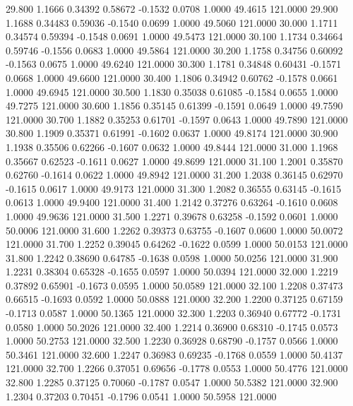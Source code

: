  29.800   1.1666   0.34392   0.58672  -0.1532   0.0708   1.0000  49.4615 121.0000
  29.900   1.1688   0.34483   0.59036  -0.1540   0.0699   1.0000  49.5060 121.0000
  30.000   1.1711   0.34574   0.59394  -0.1548   0.0691   1.0000  49.5473 121.0000
  30.100   1.1734   0.34664   0.59746  -0.1556   0.0683   1.0000  49.5864 121.0000
  30.200   1.1758   0.34756   0.60092  -0.1563   0.0675   1.0000  49.6240 121.0000
  30.300   1.1781   0.34848   0.60431  -0.1571   0.0668   1.0000  49.6600 121.0000
  30.400   1.1806   0.34942   0.60762  -0.1578   0.0661   1.0000  49.6945 121.0000
  30.500   1.1830   0.35038   0.61085  -0.1584   0.0655   1.0000  49.7275 121.0000
  30.600   1.1856   0.35145   0.61399  -0.1591   0.0649   1.0000  49.7590 121.0000
  30.700   1.1882   0.35253   0.61701  -0.1597   0.0643   1.0000  49.7890 121.0000
  30.800   1.1909   0.35371   0.61991  -0.1602   0.0637   1.0000  49.8174 121.0000
  30.900   1.1938   0.35506   0.62266  -0.1607   0.0632   1.0000  49.8444 121.0000
  31.000   1.1968   0.35667   0.62523  -0.1611   0.0627   1.0000  49.8699 121.0000
  31.100   1.2001   0.35870   0.62760  -0.1614   0.0622   1.0000  49.8942 121.0000
  31.200   1.2038   0.36145   0.62970  -0.1615   0.0617   1.0000  49.9173 121.0000
  31.300   1.2082   0.36555   0.63145  -0.1615   0.0613   1.0000  49.9400 121.0000
  31.400   1.2142   0.37276   0.63264  -0.1610   0.0608   1.0000  49.9636 121.0000
  31.500   1.2271   0.39678   0.63258  -0.1592   0.0601   1.0000  50.0006 121.0000
  31.600   1.2262   0.39373   0.63755  -0.1607   0.0600   1.0000  50.0072 121.0000
  31.700   1.2252   0.39045   0.64262  -0.1622   0.0599   1.0000  50.0153 121.0000
  31.800   1.2242   0.38690   0.64785  -0.1638   0.0598   1.0000  50.0256 121.0000
  31.900   1.2231   0.38304   0.65328  -0.1655   0.0597   1.0000  50.0394 121.0000
  32.000   1.2219   0.37892   0.65901  -0.1673   0.0595   1.0000  50.0589 121.0000
  32.100   1.2208   0.37473   0.66515  -0.1693   0.0592   1.0000  50.0888 121.0000
  32.200   1.2200   0.37125   0.67159  -0.1713   0.0587   1.0000  50.1365 121.0000
  32.300   1.2203   0.36940   0.67772  -0.1731   0.0580   1.0000  50.2026 121.0000
  32.400   1.2214   0.36900   0.68310  -0.1745   0.0573   1.0000  50.2753 121.0000
  32.500   1.2230   0.36928   0.68790  -0.1757   0.0566   1.0000  50.3461 121.0000
  32.600   1.2247   0.36983   0.69235  -0.1768   0.0559   1.0000  50.4137 121.0000
  32.700   1.2266   0.37051   0.69656  -0.1778   0.0553   1.0000  50.4776 121.0000
  32.800   1.2285   0.37125   0.70060  -0.1787   0.0547   1.0000  50.5382 121.0000
  32.900   1.2304   0.37203   0.70451  -0.1796   0.0541   1.0000  50.5958 121.0000
